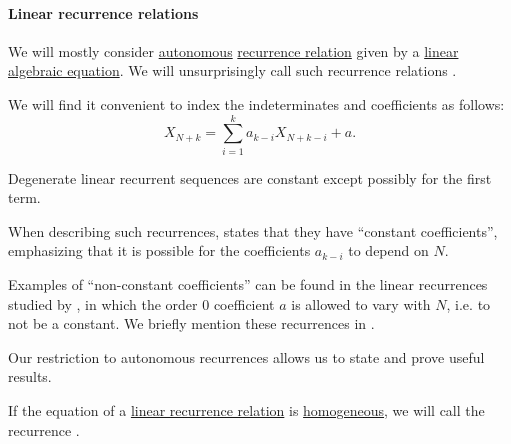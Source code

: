 \paragraph{Linear recurrence relations}

\begin{definition}\label{def:linear_recurrence}
  We will mostly consider \hyperref[def:autonomous_recurrence_relation]{autonomous} \hyperref[def:recurrence_relation]{recurrence relation} given by a \hyperref[def:polynomial_degree_terminology]{linear} \hyperref[def:algebraic_equation]{algebraic equation}. We will unsurprisingly call such recurrence relations .

  We will find it convenient to index the indeterminates and coefficients as follows:
  \begin{equation}\label{eq:def:linear_recurrence}
    X_{N+k} = \sum_{i=1}^k a_{k-i} X_{N+k-i} + a.
  \end{equation}
\end{definition}
\begin{comments}
  \item Degenerate linear recurrent sequences are constant except possibly for the first term.
  \item When describing such recurrences,  states that they have \enquote{constant coefficients}, emphasizing that it is possible for the coefficients \( a_{k-i} \) to depend on \( N \).

  Examples of \enquote{non-constant coefficients} can be found in the linear recurrences studied by , in which the order \( 0 \) coefficient \( a \) is allowed to vary with \( N \), i.e. to not be a constant. We briefly mention these recurrences in .

  Our restriction to autonomous recurrences allows us to state and prove useful results.
\end{comments}

\begin{definition}\label{def:homogeneous_linear_recurrence}
  If the equation of a \hyperref[def:linear_recurrence]{linear recurrence relation} is \hyperref[def:homogeneous_equation]{homogeneous}, we will call the recurrence .
\end{definition}

